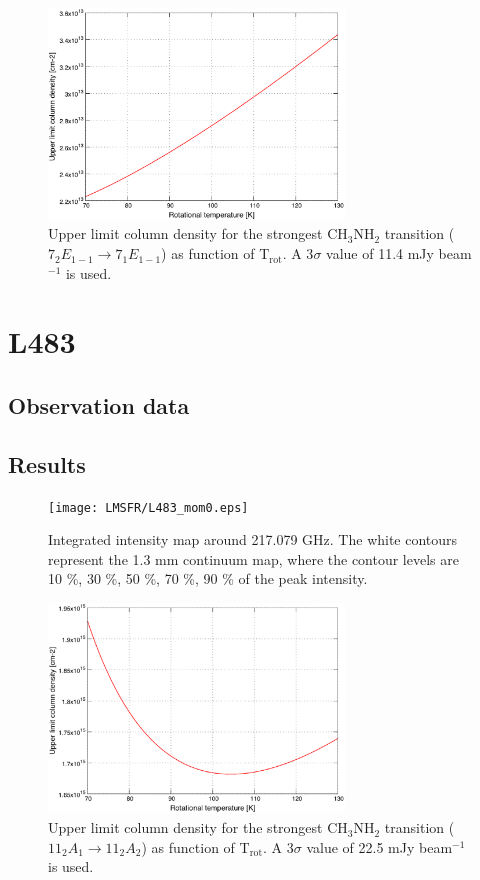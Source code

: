 \begin{figure}[H]
  \centering
  \includegraphics[width=0.7\textwidth]{LMSFR/IRAS16293.eps}
  \caption{Upper limit column density for the strongest CH$_{3}$NH$_{2}$ transition
  ($7_{2}E_{1-1} \rightarrow 7_{1}E_{1-1}$) as function of T$_{\textrm{rot}}$. A 3$\sigma$ value of 
  11.4 mJy beam$^{-1}$ is used.}
  \label{IRAS16293_MA}
\end{figure}



\section{L483}
\subsection{Observation data}
\subsection{Results}

\begin{figure}[H]
  \centering
  \texttt{[image: LMSFR/L483\_mom0.eps]}
  \caption{Integrated intensity map around 217.079 GHz. The white contours represent the 1.3 mm continuum map, where the contour levels are 10 \%, 30 \%, 50 \%, 70 \%, 90 \% of the peak intensity.}
  \label{L483_mom0}
\end{figure}

\begin{figure}[H]
  \centering
  \includegraphics[width=0.7\textwidth]{LMSFR/L483.eps}
  \caption{Upper limit column density for the strongest CH$_{3}$NH$_{2}$ transition
  ($11_{2}A_{1} \rightarrow 11_{2}A_{2}$) as function of T$_{\textrm{rot}}$. A 3$\sigma$ value of 
  22.5 mJy beam$^{-1}$ is used.}
  \label{L483_MA}
\end{figure}

